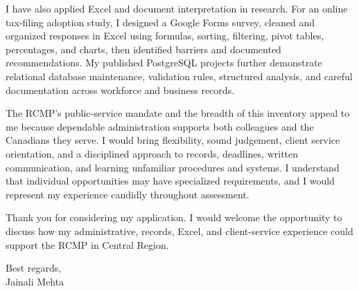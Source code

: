 \documentclass[letterpaper,11pt]{article}
\begin{document}
\bigbreak
I have also applied Excel and document interpretation in research. For an online tax-filing adoption study, I designed a Google Forms survey, cleaned and organized responses in Excel using formulas, sorting, filtering, pivot tables, percentages, and charts, then identified barriers and documented recommendations. My published PostgreSQL projects further demonstrate relational database maintenance, validation rules, structured analysis, and careful documentation across workforce and business records.

\bigbreak
The RCMP's public-service mandate and the breadth of this inventory appeal to me because dependable administration supports both colleagues and the Canadians they serve. I would bring flexibility, sound judgement, client service orientation, and a disciplined approach to records, deadlines, written communication, and learning unfamiliar procedures and systems. I understand that individual opportunities may have specialized requirements, and I would represent my experience candidly throughout assessment.

\bigbreak
Thank you for considering my application. I would welcome the opportunity to discuss how my administrative, records, Excel, and client-service experience could support the RCMP in Central Region.

\bigbreak
Best regards,\\
Jainali Mehta
\end{document}
